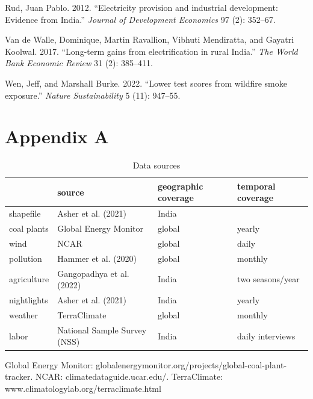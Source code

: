 \documentclass[
]{article}
\newlength{\cslhangindent}
\newlength{\cslentryspacingunit} %
\newenvironment{CSLReferences}[2] %
 {%
  \setlength{\parindent}{0pt}
  \ifodd #1
  \let\oldpar\par
  \def\par{\hangindent=\cslhangindent\oldpar}
  \fi
  \setlength{\parskip}{#2\cslentryspacingunit}
 }%
 {}
\newcommand{\beginappendix}{ \setcounter{table}{0} \renewcommand{\thetable}{A\arabic{table}} \setcounter{figure}{0} \renewcommand{\thefigure}{A\arabic{figure}} }
\begin{document}
\begin{CSLReferences}{1}{0}
\leavevmode{}%
Rud, Juan Pablo. 2012. {``{Electricity provision and industrial development: Evidence from India}.''} \emph{{Journal of Development Economics}} 97 (2): 352--67.

\leavevmode{}%
Van de Walle, Dominique, Martin Ravallion, Vibhuti Mendiratta, and Gayatri Koolwal. 2017. {``{Long-term gains from electrification in rural India}.''} \emph{{The World Bank Economic Review}} 31 (2): 385--411.

\leavevmode{}%
Wen, Jeff, and Marshall Burke. 2022. {``{Lower test scores from wildfire smoke exposure}.''} \emph{{Nature Sustainability}} 5 (11): 947--55.

\end{CSLReferences}

\FloatBarrier
\newpage

\hypertarget{appendix-a}{%
\section*{Appendix A}\label{appendix-a}}

\beginappendix
\FloatBarrier

\begin{table}[H]

\caption{\label{tab:data}Data sources}
\centering
\begin{threeparttable}
\begin{tabular}[t]{>{\raggedright\arraybackslash}p{2cm}>{\centering\arraybackslash}p{5cm}>{\centering\arraybackslash}p{3cm}>{\centering\arraybackslash}p{3cm}}
\toprule
  & source & geographic coverage & temporal coverage\\
\midrule
shapefile & Asher et al. (2021) & India & \\
coal plants & Global Energy Monitor & global & yearly\\
wind & NCAR & global & daily\\
pollution & Hammer et al. (2020) & global & monthly\\
agriculture & Gangopadhya et al. (2022) & India & two seasons/year\\
nightlights & Asher et al. (2021) & India & yearly\\
weather & TerraClimate & global & monthly\\
labor & National Sample Survey (NSS) & India & daily interviews\\
\bottomrule
\end{tabular}
\begin{tablenotes}[para]
\item Global Energy Monitor: globalenergymonitor.org/projects/global-coal-plant-tracker. NCAR: climatedataguide.ucar.edu/. TerraClimate: www.climatologylab.org/terraclimate.html
\end{tablenotes}
\end{threeparttable}
\end{table}
\end{document}
